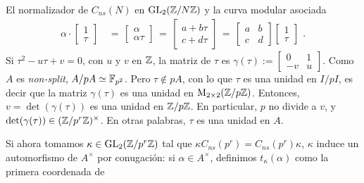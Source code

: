 \begin{subsection}{El normalizador de $C_{ns}(N)$ en $\mathrm{GL}_{2}(\mathbb{Z}/N\mathbb{Z})$ %
		y la curva modular asociada}
\begin{align*}
 \alpha\cdot\begin{bmatrix} 1\\ \tau \end{bmatrix} & \,=\,
 \begin{bmatrix} \alpha\\ \alpha\tau \end{bmatrix} \,=\,
 \begin{bmatrix} a+b\tau\\ c+d\tau \end{bmatrix} \,=\,
 \begin{bmatrix} a&b\\c&d \end{bmatrix}
 \begin{bmatrix} 1\\ \tau \end{bmatrix}\text{ .}
\end{align*}
Si $\tau^{2}-u\tau+v=0$, con $u$ y $v$ en $\mathbb{Z}$, la matriz de $\tau$ es
\begin{math}
 \gamma(\tau):=
 \left[\begin{smallmatrix}0&1\\-v&u\end{smallmatrix}\right]
\end{math}.
Como $A$ es \textit{non-split}, $A/pA\simeq\mathbb{F}_{p^{2}}$. Pero $\tau\not\in pA$,
con lo que $\tau$ es una unidad en $I/pI$, es decir que la matriz $\gamma(\tau)$
es una unidad en $\mathrm{M}_{2\times 2}(\mathbb{Z}/p\mathbb{Z})$. Entonces, $v=\det(\gamma(\tau))$
es una unidad en $\mathbb{Z}/p\mathbb{Z}$. En particular, $p$ no divide a $v$, y
$\mathrm{det}(\gamma(\tau))\in(\mathbb{Z}/p^{r}\mathbb{Z})^{\times}$. En otras palabras,
$\tau$ es una unidad en $A$.

Si ahora tomamos $\kappa\in\mathrm{GL}_{2}(\mathbb{Z}/p^{r}\mathbb{Z})$ tal que
$\kappa C_{ns}(p^{r})=C_{ns}(p^{r})\kappa$, $\kappa$ induce un automorfismo de
$A^{\times}$ por conugaci\'{o}n: si $\alpha\in A^{\times}$, definimos
$t_{\kappa}(\alpha)$ como la primera coordenada de


\end{subsection}
